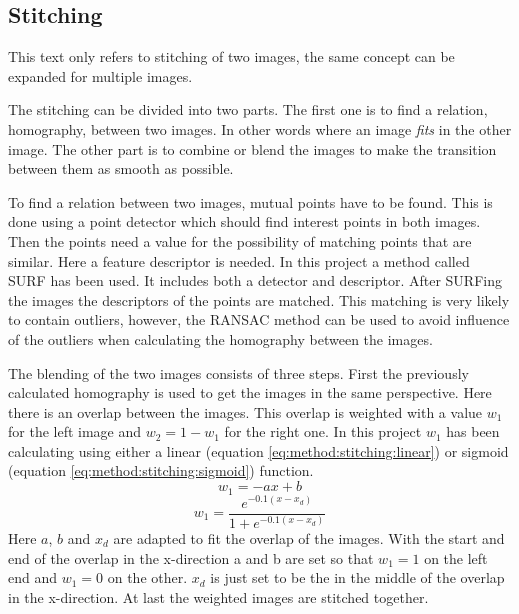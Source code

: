 \subsection{Stitching}
This text only refers to stitching of two images, the same concept can be expanded for multiple images.

The stitching can be divided into two parts.
The first one is to find a relation, homography, between two images.
In other words where an image {\it fits} in the other image.
The other part is to combine or blend the images to make the transition between them as smooth as possible.

To find a relation between two images, mutual points have to be found.
This is done using a point detector which should find interest points in both images.
Then the points need a value for the possibility of matching points that are similar.
Here a feature descriptor is needed.
In this project a method called SURF has been used.
It includes both a detector and descriptor.
After SURFing the images the descriptors of the points are matched.
This matching is very likely to contain outliers, however, the RANSAC method can be used to avoid influence of the outliers when calculating the homography between the images.

The blending of the two images consists of three steps.
First the previously calculated homography is used to get the images in the same perspective.
Here there is an overlap between the images.
This overlap is weighted with a value $w_1$ for the left image and $w_2 = 1 - w_1$ for the right one.
In this project $w_1$ has been calculating using either a linear (equation \ref{eq:method:stitching:linear}) or sigmoid (equation \ref{eq:method:stitching:sigmoid}) function.
\begin{equation} \label{eq:method:stitching:linear}
  w_1 = -a x + b
\end{equation}
\begin{equation} \label{eq:method:stitching:sigmoid}
  w_1 = \frac{e^{-0.1(x - x_d)}}{1 + e^{-0.1(x - x_d)}}
\end{equation}
Here $a$, $b$ and $x_d$ are adapted to fit the overlap of the images.
With the start and end of the overlap in the x-direction a and b are set so that $w_1 = 1$ on the left end and $w_1 = 0$ on the other.
$x_d$ is just set to be the in the middle of the overlap in the x-direction.
At last the weighted images are stitched together.
